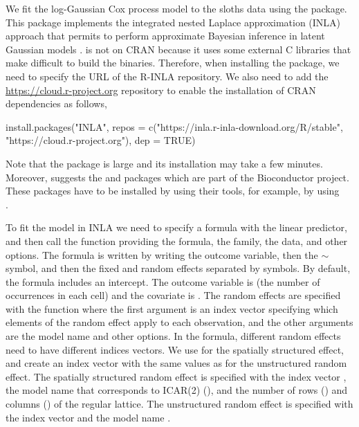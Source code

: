 We fit the log-Gaussian Cox process model to the sloths data using the  package. This package implements the integrated nested Laplace approximation (INLA) approach that permits to perform approximate Bayesian inference in latent Gaussian models \citep{rueetal09, moraga19}.
 is not on CRAN because it uses some external C libraries that make difficult to build the binaries. 
Therefore, when installing the package, we need to specify the URL of the R-INLA repository.
We also need to add the \url{https://cloud.r-project.org} repository to enable the installation of CRAN dependencies as follows,

\begin{example}
install.packages("INLA", repos = c("https://inla.r-inla-download.org/R/stable",
                                   "https://cloud.r-project.org"), dep = TRUE)
\end{example}


Note that the  package is large and its installation may take a few minutes.
Moreover,  suggests the  and  packages which are part of the Bioconductor project. These packages have to be installed by using their tools, for example, by using\\  
.


To fit the model in INLA we need to specify a formula with the linear predictor, and then call the  function providing the formula, the family, the data, and other options.
The formula is written by writing the outcome variable,
then the $\sim$ symbol, and then the fixed and random effects separated by \code{+} symbols.
By default, the formula includes an intercept.
The outcome variable is  (the number of occurrences in each cell) and the covariate is .
The random effects are specified with the  function where the first argument is an index vector specifying which elements of the random effect apply to each observation, and the other arguments are the model name and other options.
In the formula, different random effects need to have different indices vectors.
We use  for the spatially structured effect,
and create an index vector  with the same values as 
for the unstructured random effect.
The spatially structured random effect is specified with the index vector , the model name that corresponds to ICAR(2) (), and the number of rows () and columns () of the regular lattice. 
The unstructured random effect is specified with the index vector  and the model name .

